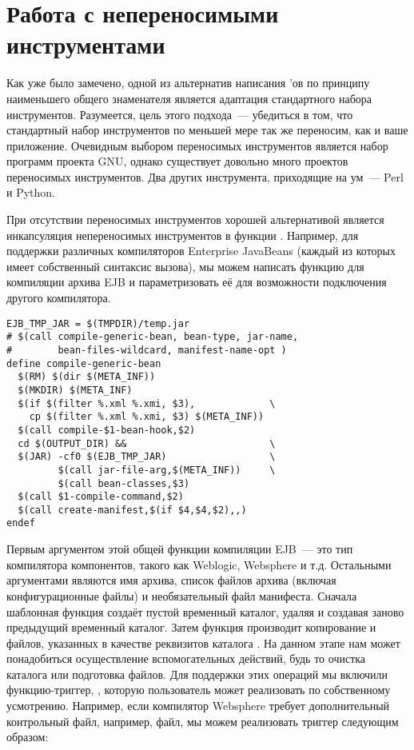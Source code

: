 \section{Работа с непереносимыми инструментами}

Как уже было замечено, одной из альтернатив написания \Makefile{}'ов
по принципу наименьшего общего знаменателя является адаптация
стандартного набора инструментов. Разумеется, цель этого подхода~---
убедиться в том, что стандартный набор инструментов по меньшей мере
так же переносим, как и ваше приложение. Очевидным выбором переносимых
инструментов является набор программ проекта GNU, однако существует
довольно много проектов переносимых инструментов. Два других
инструмента, приходящие на ум~--- Perl и Python.

При отсутствии переносимых инструментов хорошей альтернативой является
инкапсуляция непереносимых инструментов в функции \GNUmake{}.
Например, для поддержки различных компиляторов Enterprise JavaBeans
(каждый из которых имеет собственный синтаксис вызова), мы можем
написать функцию для компиляции архива EJB и параметризовать её для
возможности подключения другого компилятора.

{\footnotesize
\begin{verbatim}
EJB_TMP_JAR = $(TMPDIR)/temp.jar
# $(call compile-generic-bean, bean-type, jar-name,
#        bean-files-wildcard, manifest-name-opt )
define compile-generic-bean
  $(RM) $(dir $(META_INF))
  $(MKDIR) $(META_INF)
  $(if $(filter %.xml %.xmi, $3),             \
    cp $(filter %.xml %.xmi, $3) $(META_INF))
  $(call compile-$1-bean-hook,$2)
  cd $(OUTPUT_DIR) &&                         \
  $(JAR) -cf0 $(EJB_TMP_JAR)                  \
         $(call jar-file-arg,$(META_INF))     \
         $(call bean-classes,$3)
  $(call $1-compile-command,$2)
  $(call create-manifest,$(if $4,$4,$2),,)
endef
\end{verbatim}
}

Первым аргументом этой общей функции компиляции EJB~--- это тип
компилятора компонентов, такого как Weblogic, Websphere и т.д.
Остальными аргументами являются имя архива, список файлов архива
(включая конфигурационные файлы) и необязательный файл манифеста.
Сначала шаблонная функция создаёт пустой временный каталог, удаляя и
создавая заново предыдущий временный каталог. Затем функция производит
копирование \filename{xml} и \filename{xmi} файлов, указанных в
качестве реквизитов каталога \variable{\$(META\_INF)}. На данном этапе
нам может понадобиться осуществление вспомогательных действий, будь то
очистка каталога \filename{META-INF} или подготовка 
файлов. Для поддержки этих операций мы включили функцию-триггер,
\function{compile-\$1-bean-hook}, которую пользователь может
реализовать по собственному усмотрению. Например, если компилятор
Websphere требует дополнительный контрольный файл, например,
\filename{xsl} файл, мы можем реализовать триггер следующим образом:

